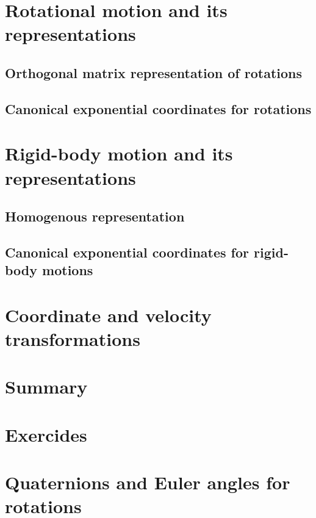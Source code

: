 \documentclass{book}
\begin{document}
\section{Rotational motion and its representations}

\subsection{Orthogonal matrix representation of rotations}

\subsection{Canonical exponential coordinates for rotations}

\section{Rigid-body motion and its representations}

\subsection{Homogenous representation}

\subsection{Canonical exponential coordinates for rigid-body motions}

\section{Coordinate and velocity transformations}

\section{Summary}

\section{Exercides}

\section{Quaternions and Euler angles for rotations}
\end{document}
